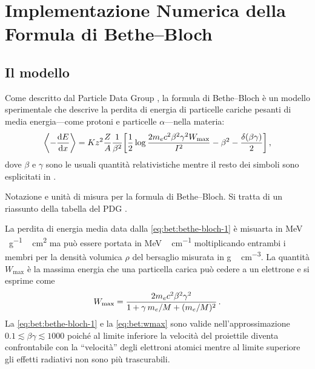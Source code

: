 \chapter[Implementazione Numerica della Formula di Bethe--Bloch][Formula di Bethe--Bloch]{Implementazione Numerica della Formula di Bethe--Bloch}\label{ch:bet}

\section{Il modello}
    Come descritto dal Particle Data Group \cite{PhysRevD-110-030001}, la formula di Bethe--Bloch è un modello sperimentale che descrive la perdita di energia di particelle cariche pesanti di media energia---come protoni e particelle $\alpha$---nella materia:
    \begin{equation}
        \left\langle -\dv{E}{x}\right\rangle
        = Kz^2 \frac{Z}{A}\frac{1}{\beta^2}\bqty{\frac{1}{2}\log\frac{2 m_e c^2 \beta^2 \gamma^2 W_\text{max}}{I^2} - \beta^2 - \frac{\delta\pqty{\beta\gamma}}{2}}
        \mycomma
        \label{eq:bet:bethe-bloch-1}
    \end{equation}
    dove $\beta$ e $\gamma$ sono le usuali quantità relativistiche mentre il resto dei simboli sono esplicitati in .
    \begin{table}
        \footnotesize
        \centering
        
        \caption{Notazione e unità di misura per la formula di Bethe--Bloch. Si tratta di un riassunto della tabella del PDG \cite{PhysRevD-110-030001}.}
        \label{tab:bet:costanti}
    \end{table}
    La perdita di energia media data dalla \eqref{eq:bet:bethe-bloch-1} è misuarta in \unit{\mega\eV\,\gram^{-1}\,\centi\meter^2} ma può essere portata in \unit{\mega\eV\,\centi\meter^{-1}} moltiplicando entrambi i membri per la densità volumica $\rho$ del bersaglio misurata in \unit{\gram\,\centi\meter^{-3}}. La quantità $W_\text{max}$ è la massima energia che una particella carica può cedere a un elettrone e si esprime come
    \begin{equation}
        W_\text{max} = \frac{2 m_e c^2 \beta^2 \gamma^2}{1 + \gamma\, m_e / M + (m_e / M)^2}
        \,. 
        \label{eq:bet:wmax}
    \end{equation}
    La \eqref{eq:bet:bethe-bloch-1} e la \eqref{eq:bet:wmax} sono valide nell'approssimazione $\num{0.1} \lesssim \beta\gamma \lesssim \num{1000}$ poiché al limite inferiore la velocità del proiettile diventa confrontabile con la ``velocità'' degli elettroni atomici mentre al limite superiore gli effetti radiativi non sono più trascurabili.

